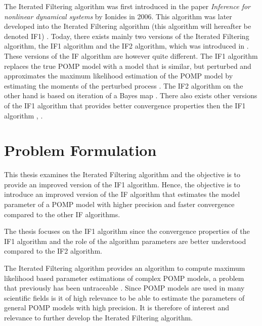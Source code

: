 \documentclass[twoside,openright]{report}
\begin{document}
The Iterated Filtering algorithm was first introduced in the paper \textit{Inference for nonlinear dynamical systems} by Ionides in 2006. This algorithm was later developed into the Iterated Filtering algorithm (this algorithm will hereafter be denoted  IF1) \cite{ionides2011iterated}. Today, there exists mainly two versions of the Iterated Filtering algorithm, the IF1 algorithm and the IF2 algorithm, which was introduced in \cite{ionides2015inference}. These versions of the IF algorithm are however quite different. The IF1 algorithm replaces the true POMP model with a model that is similar, but perturbed and approximates the maximum likelihood estimation of the  POMP model by estimating the moments of the perturbed process \cite{ionides2011iterated}. The IF2 algorithm on the other hand is based on iteration of a Bayes map \cite{ionides2015inference}. There also exists other versions of the IF1 algorithm that provides better convergence properties then the IF1 algorithm \cite{ionides2012efficient}, \cite{lindstrom2013tuned}. 


\section{Problem Formulation} \label{sec:problem_form}
This thesis examines the Iterated Filtering algorithm and the objective is to provide an improved version of the IF1 algorithm. Hence, the objective is to introduce an improved version of the IF algorithm that estimates the model parameter of a POMP model with higher precision and faster convergence compared to the other IF algorithms. 

The thesis focuses on the IF1 algorithm since the convergence properties of the IF1 algorithm and the role of the algorithm parameters are better  understood compared to the IF2 algorithm. 

The Iterated Filtering algorithm provides an algorithm to compute maximum likelihood based parameter estimations of complex POMP models, a problem that previously has been untraceable \cite{ionides2006inference}. Since POMP models  are used in many scientific fields is it of high relevance to be able to estimate the parameters of general POMP models with high precision. It is therefore of interest and relevance to further develop the Iterated Filtering algorithm. 
\end{document}
